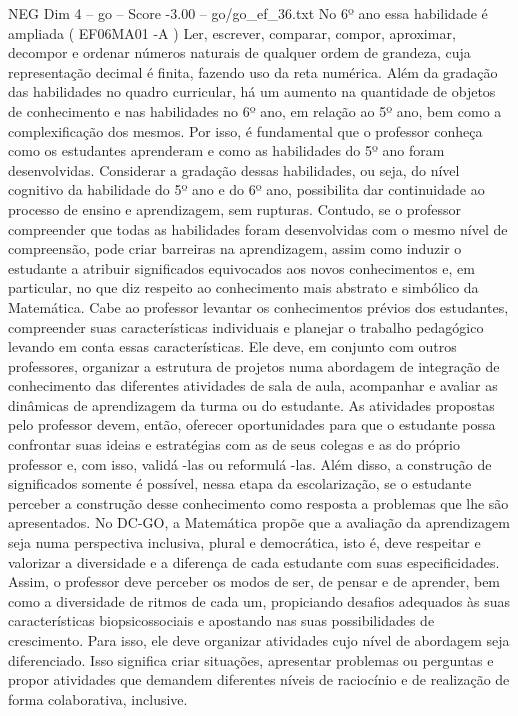 \begin{textsample}{NEG Dim 4 – go – Score -3.00 – go/go\_ef\_36.txt}
No 6º ano essa habilidade é ampliada ( EF06MA01 -A ) Ler, escrever, comparar, compor, aproximar, decompor e ordenar números naturais de qualquer ordem de grandeza, cuja representação decimal é finita, fazendo uso da reta numérica.
Além da gradação das habilidades no quadro curricular, há um aumento na quantidade de objetos de conhecimento e nas habilidades no 6º ano, em relação ao 5º ano, bem como a complexificação dos mesmos.
Por isso, é fundamental que o professor conheça como os estudantes aprenderam e como as habilidades do 5º ano foram desenvolvidas.
Considerar a gradação dessas habilidades, ou seja, do nível cognitivo da habilidade do 5º ano e do 6º ano, possibilita dar continuidade ao processo de ensino e aprendizagem, sem rupturas.
Contudo, se o professor compreender que todas as habilidades foram desenvolvidas com o mesmo nível de compreensão, pode criar barreiras na aprendizagem, assim como induzir o estudante a atribuir significados equivocados aos novos conhecimentos e, em particular, no que diz respeito ao conhecimento mais abstrato e simbólico da Matemática.
Cabe ao professor levantar os conhecimentos prévios dos estudantes, compreender suas características individuais e planejar o trabalho pedagógico levando em conta essas características.
Ele deve, em conjunto com outros professores, organizar a estrutura de projetos numa abordagem de integração de conhecimento das diferentes atividades de sala de aula, acompanhar e avaliar as dinâmicas de aprendizagem da turma ou do estudante.
As atividades propostas pelo professor devem, então, oferecer oportunidades para que o estudante possa confrontar suas ideias e estratégias com as de seus colegas e as do próprio professor e, com isso, validá -las ou reformulá -las.
Além disso, a construção de significados somente é possível, nessa etapa da escolarização, se o estudante perceber a construção desse conhecimento como resposta a problemas que lhe são apresentados.
No DC-GO, a Matemática propõe que a avaliação da aprendizagem seja numa perspectiva inclusiva, plural e democrática, isto é, deve respeitar e valorizar a diversidade e a diferença de cada estudante com suas especificidades.
Assim, o professor deve perceber os modos de ser, de pensar e de aprender, bem como a diversidade de ritmos de cada um, propiciando desafios adequados às suas características biopsicossociais e apostando nas suas possibilidades de crescimento.
Para isso, ele deve organizar atividades cujo nível de abordagem seja diferenciado.
Isso significa criar situações, apresentar problemas ou perguntas e propor atividades que demandem diferentes níveis de raciocínio e de realização de forma colaborativa, inclusive.

\end{textsample}
